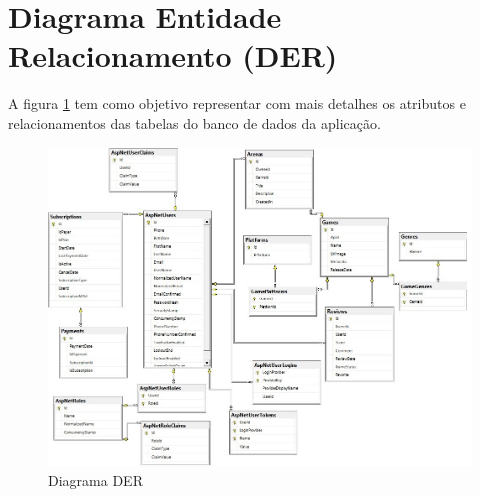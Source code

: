 \clearpage
\section{Diagrama Entidade Relacionamento (DER)}
A figura \ref{DiagramaDer} tem como objetivo representar com mais detalhes os atributos e relacionamentos das tabelas do banco de dados da aplicação.

\begin{figure}
    \centering
	\caption{Diagrama DER}
    \label{DiagramaDer}
    \includegraphics[scale =0.70]{imagens/arquitetura/diagrama-der.jpeg}	
\end{figure}